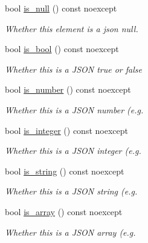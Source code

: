 \begin{DoxyCompactItemize}
\item 
bool \hyperlink{classsimdjson_1_1document_1_1element_a3ba0d5f3bc4427ff01d3a7f9af410188}{is\+\_\+null} () const noexcept
\begin{DoxyCompactList}\small\item\em Whether this element is a json {\ttfamily null}. \end{DoxyCompactList}\item 
\mbox{\label{classsimdjson_1_1document_1_1element_a6fe1123a9465729ac3def2317253301e}} 
bool \hyperlink{classsimdjson_1_1document_1_1element_a6fe1123a9465729ac3def2317253301e}{is\+\_\+bool} () const noexcept
\begin{DoxyCompactList}\small\item\em Whether this is a J\+S\+ON {\ttfamily true} or {\ttfamily false} \end{DoxyCompactList}\item 
bool \hyperlink{classsimdjson_1_1document_1_1element_a228b17e13e1a303052a8d6e758c84dde}{is\+\_\+number} () const noexcept
\begin{DoxyCompactList}\small\item\em Whether this is a J\+S\+ON number (e.\+g. \end{DoxyCompactList}\item 
bool \hyperlink{classsimdjson_1_1document_1_1element_ab022f58390a1553a581d9c6668eb53ba}{is\+\_\+integer} () const noexcept
\begin{DoxyCompactList}\small\item\em Whether this is a J\+S\+ON integer (e.\+g. \end{DoxyCompactList}\item 
bool \hyperlink{classsimdjson_1_1document_1_1element_ab50f025cf9a300e77d06c9bacd04c62a}{is\+\_\+string} () const noexcept
\begin{DoxyCompactList}\small\item\em Whether this is a J\+S\+ON string (e.\+g. \end{DoxyCompactList}\item 
bool \hyperlink{classsimdjson_1_1document_1_1element_a65800f96c37e88e89ab36d3bb3202f27}{is\+\_\+array} () const noexcept
\begin{DoxyCompactList}\small\item\em Whether this is a J\+S\+ON array (e.\+g. \end{DoxyCompactList}\item 

\end{DoxyCompactItemize}
